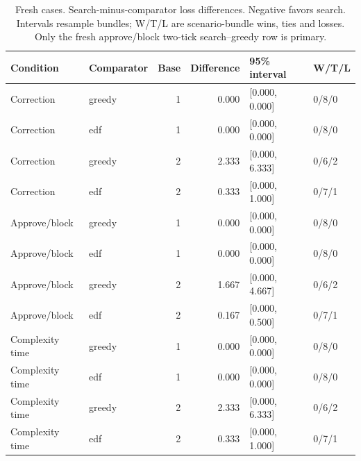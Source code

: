 \begin{table}[t]
\caption{Fresh cases. Search-minus-comparator loss differences. Negative favors search. Intervals resample bundles; W/T/L are scenario-bundle wins, ties and losses. Only the fresh approve/block two-tick search--greedy row is primary.}
\centering\small
\begin{tabular}{llrrll}
\toprule
Condition & Comparator & Base & Difference & 95\% interval & W/T/L \\
\midrule
Correction & greedy & 1 & 0.000 & [0.000, 0.000] & 0/8/0 \\
Correction & edf & 1 & 0.000 & [0.000, 0.000] & 0/8/0 \\
Correction & greedy & 2 & 2.333 & [0.000, 6.333] & 0/6/2 \\
Correction & edf & 2 & 0.333 & [0.000, 1.000] & 0/7/1 \\
Approve/block & greedy & 1 & 0.000 & [0.000, 0.000] & 0/8/0 \\
Approve/block & edf & 1 & 0.000 & [0.000, 0.000] & 0/8/0 \\
Approve/block & greedy & 2 & 1.667 & [0.000, 4.667] & 0/6/2 \\
Approve/block & edf & 2 & 0.167 & [0.000, 0.500] & 0/7/1 \\
Complexity time & greedy & 1 & 0.000 & [0.000, 0.000] & 0/8/0 \\
Complexity time & edf & 1 & 0.000 & [0.000, 0.000] & 0/8/0 \\
Complexity time & greedy & 2 & 2.333 & [0.000, 6.333] & 0/6/2 \\
Complexity time & edf & 2 & 0.333 & [0.000, 1.000] & 0/7/1 \\
\bottomrule
\end{tabular}
\end{table}

